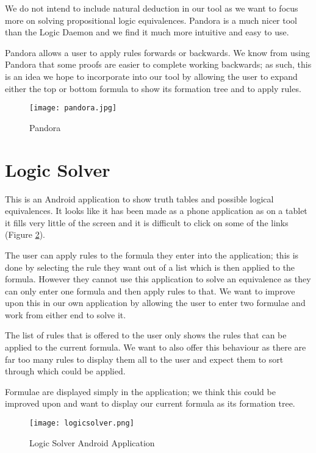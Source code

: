 \documentclass{report}
\begin{document}
We do not intend to include natural deduction in our tool as we want to focus more on solving propositional logic equivalences. Pandora is a much nicer tool than the Logic Daemon and we find it much more intuitive and easy to use.

Pandora allows a user to apply rules forwards or backwards. We know from using Pandora that some proofs are easier to complete working backwards; as such, this is an idea we hope to incorporate into our tool by allowing the user to expand either the top or bottom formula to show its formation tree and to apply rules. 

\begin{figure}[ht]
    \centering
    \texttt{[image: pandora.jpg]}
    \caption{Pandora}
    \label{pandora}
\end{figure}

\section{Logic Solver}

This is an Android application to show truth tables and possible logical equivalences. It looks like it has been made as a phone application as on a tablet it fills very little of the screen and it is difficult to click on some of the links (Figure \ref{logicsolver}).

The user can apply rules to the formula they enter into the application; this is done by selecting the rule they want out of a list which is then applied to the formula. However they cannot use this application to solve an equivalence as they can only enter one formula and then apply rules to that. We want to improve upon this in our own application by allowing the user to enter two formulae and work from either end to solve it.

The list of rules that is offered to the user only shows the rules that can be applied to the current formula. We want to also offer this behaviour as there are far too many rules to display them all to the user and expect them to sort through which could be applied.

Formulae are displayed simply in the application; we think this could be improved upon and want to display our current formula as its formation tree.

\begin{figure}[ht]
    \centering
    \texttt{[image: logicsolver.png]}
    \caption{Logic Solver Android Application}
    \label{logicsolver}
\end{figure}
\end{document}
